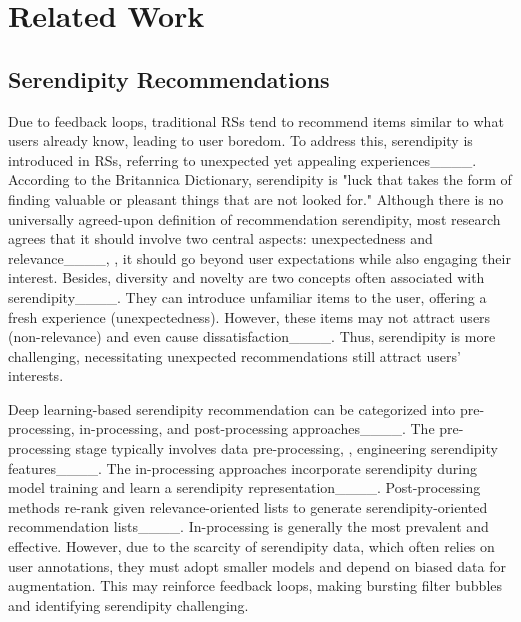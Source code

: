 \section{Related Work}
\subsection{Serendipity Recommendations}

Due to feedback loops, traditional RSs tend to recommend items similar to what users already know, leading to user boredom. To address this, serendipity is introduced in RSs, referring to unexpected yet appealing experiences____. According to the Britannica Dictionary, serendipity is "luck that takes the form of finding valuable or pleasant things that are not looked for." Although there is no universally agreed-upon definition of recommendation serendipity, most research agrees that it should involve two central aspects: unexpectedness and relevance____, \ie, 
it should go beyond user expectations while also engaging their interest. 
Besides, diversity and novelty are two concepts often associated with serendipity____. They can introduce unfamiliar items to the user, offering a fresh experience (unexpectedness). However, these items may not attract users (non-relevance) and even cause dissatisfaction____. Thus, serendipity is more challenging, necessitating unexpected recommendations still attract users' interests.


Deep learning-based serendipity recommendation can be categorized into pre-processing, in-processing, and post-processing approaches____. The pre-processing stage typically involves data pre-processing, \eg, engineering serendipity features____. 
The in-processing approaches incorporate serendipity during model training and learn a serendipity representation____.
Post-processing methods re-rank given relevance-oriented lists to generate serendipity-oriented recommendation lists____. 
In-processing is generally the most prevalent and effective. However, due to the scarcity of serendipity data, which often relies on user annotations, they must adopt smaller models and depend on biased data for augmentation. This may reinforce feedback loops, making bursting filter bubbles and identifying serendipity challenging.



